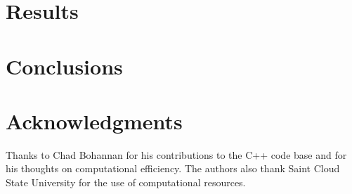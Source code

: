 \documentclass[preprint,12pt]{elsarticle}
\begin{document}

\section{Results}\label{sec:bode}




\section{Conclusions}\label{conclusions}






\section*{Acknowledgments}

Thanks to Chad Bohannan for his contributions to the C++ code base and
for his thoughts on computational efficiency. The authors also thank
Saint Cloud State University for the use of computational resources.














\end{document}
